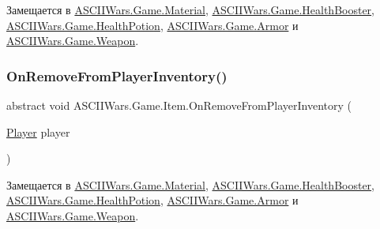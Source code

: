 Замещается в \hyperlink{class_a_s_c_i_i_wars_1_1_game_1_1_material_afedb9d9b8b22782e40371b6cac37d27e}{A\+S\+C\+I\+I\+Wars.\+Game.\+Material}, \hyperlink{class_a_s_c_i_i_wars_1_1_game_1_1_health_booster_a99740fd21f80211f6a2058737b159425}{A\+S\+C\+I\+I\+Wars.\+Game.\+Health\+Booster}, \hyperlink{class_a_s_c_i_i_wars_1_1_game_1_1_health_potion_aecf685e26442760c13e59f294ce7a5e7}{A\+S\+C\+I\+I\+Wars.\+Game.\+Health\+Potion}, \hyperlink{class_a_s_c_i_i_wars_1_1_game_1_1_armor_ab8e1364e91ddd19f7c214f051b054cd8}{A\+S\+C\+I\+I\+Wars.\+Game.\+Armor} и \hyperlink{class_a_s_c_i_i_wars_1_1_game_1_1_weapon_ad29135a3edb4ea03f29163d788364299}{A\+S\+C\+I\+I\+Wars.\+Game.\+Weapon}.

\hypertarget{class_a_s_c_i_i_wars_1_1_game_1_1_item_a52412546f837bfc65a3aa9d728fa142f}{}\label{class_a_s_c_i_i_wars_1_1_game_1_1_item_a52412546f837bfc65a3aa9d728fa142f} 
\subsubsection{\texorpdfstring{On\+Remove\+From\+Player\+Inventory()}{OnRemoveFromPlayerInventory()}}
{\footnotesize\ttfamily abstract void A\+S\+C\+I\+I\+Wars.\+Game.\+Item.\+On\+Remove\+From\+Player\+Inventory (\begin{DoxyParamCaption}\item[{\hyperlink{class_a_s_c_i_i_wars_1_1_game_1_1_player}{Player}}]{player }\end{DoxyParamCaption})\hspace{0.3cm}{\ttfamily [pure virtual]}}



Замещается в \hyperlink{class_a_s_c_i_i_wars_1_1_game_1_1_material_ab8467edc48ff6af4021f550c97cbec31}{A\+S\+C\+I\+I\+Wars.\+Game.\+Material}, \hyperlink{class_a_s_c_i_i_wars_1_1_game_1_1_health_booster_ae06407b04a0e81da31c14c546d6aaaaf}{A\+S\+C\+I\+I\+Wars.\+Game.\+Health\+Booster}, \hyperlink{class_a_s_c_i_i_wars_1_1_game_1_1_health_potion_ad708f58b7d3cbc69945cb2ccb0328f78}{A\+S\+C\+I\+I\+Wars.\+Game.\+Health\+Potion}, \hyperlink{class_a_s_c_i_i_wars_1_1_game_1_1_armor_ab113733825094b12aba14b8b48372f9c}{A\+S\+C\+I\+I\+Wars.\+Game.\+Armor} и \hyperlink{class_a_s_c_i_i_wars_1_1_game_1_1_weapon_a1fc9edec1d3881aee188a30ddc8f9e58}{A\+S\+C\+I\+I\+Wars.\+Game.\+Weapon}.



